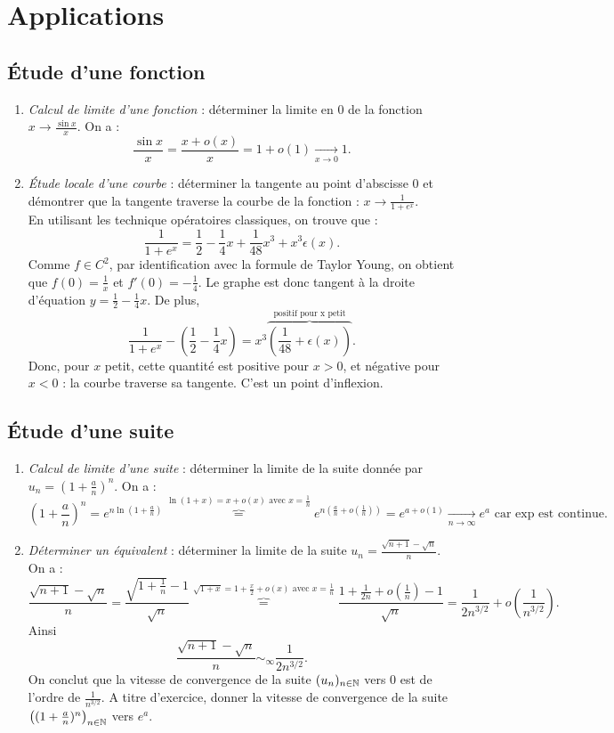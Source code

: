 \documentclass{book}
\begin{document}
\section{Applications}

\subsection{Étude d'une fonction}
\begin{enumerate}
\item \textit{Calcul de limite d'une fonction} : déterminer la limite en 0 de la fonction $x\to\frac{\sin x}{x}$. On a : 
$$\frac{\sin x}{x}= \frac{x+o(x)}{x}=1+o(1)\xrightarrow[x\to 0]{} 1.$$
\item \textit{Étude locale d'une courbe} : déterminer la tangente au point d'abscisse 0  et démontrer que la tangente traverse la courbe de la fonction : $x\to \frac{1}{1+e^x}$.\\
En utilisant les technique opératoires classiques, on trouve que :
$$\frac{1}{1+e^x}=\frac 1 2 - \frac 1 4 x + \frac{1}{48}x^3+x^3\epsilon(x).$$
Comme $f\in C^2$, par identification avec la formule de Taylor Young, on obtient que $f(0)=\frac 1 x$ et $f'(0)= - \frac 1 4$. Le graphe est donc tangent à la droite d'équation $y=\frac 1 2 - \frac 1 4 x.$
De plus, $$\frac{1}{1+e^x}- (\frac 1 2 - \frac 1 4 x)= x^3\overbrace{\left(\frac{1}{48}+\epsilon(x)\right)}^{\text{positif pour x petit}}.$$
Donc,  pour $x$ petit, cette quantité est positive pour $x>0$, et négative pour $x<0$ : la courbe traverse sa tangente. C'est un point d'inflexion.
\end{enumerate}


\subsection{Étude d'une suite}
\begin{enumerate}
\item \textit{Calcul de limite d'une suite} : déterminer la limite de la suite donnée par $u_n=(1+\frac a n )^n$. On a : 
$$(1+\frac a n )^n = e^{n\ln(1+\frac a n)}\overbrace{=}^{ \ln(1+x)=x+o(x)\text{ avec }x=\frac 1 n }e^{n\left(\frac a n + o(\frac 1 n)\right) }=e^{a+ o(1)} \xrightarrow[n\to\infty]{}  e^a\text{ car exp est continue.}$$
\item \textit{Déterminer un équivalent} : déterminer la limite de la suite $u_n=\frac{\sqrt{n+1}-\sqrt{n}}{n}$. On a :
$$\frac{\sqrt{n+1}-\sqrt{n}}{n} = \frac{\sqrt{1+\frac 1 n}-1}{\sqrt{n}}\overbrace{=}^{ \sqrt{1+x}=1+\frac x 2 +o(x)\text{ avec }x=\frac 1 n}\frac{1+\frac{1}{2n}+o(\frac 1 n) -1}{\sqrt{n}}=\frac{1}{2n^{3/2}}+o\left(\frac{1}{n^{3/2}}\right).$$
Ainsi
$$\frac{\sqrt{n+1}-\sqrt{n}}{n} \sim_{\infty} \frac{1}{2n^{3/2}}.$$
On conclut que la vitesse de convergence de la suite $(u_n)_{n\in\mathbb{N}}$ vers $0$ est de l'ordre de  $\frac{1}{n^{3/2}}$.  A titre d'exercice, donner la vitesse de convergence de la suite $\left((1+\frac a n )^n\right)_{n\in\mathbb{N}}$ vers $e^a$.
\end{enumerate}
\end{document}
